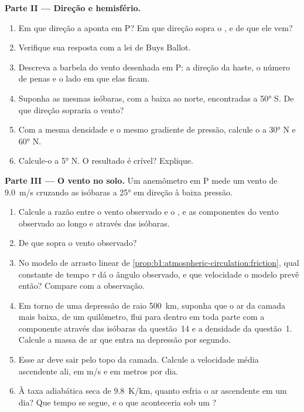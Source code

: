 \begin{problem}
\medskip
\noindent\textbf{Parte II --- Direção e hemisfério.}
\begin{enumerate}[resume]
  \item Em que direção a  aponta em P? Em que direção sopra o , e de que  ele vem?
  \item Verifique sua resposta com a lei de Buys Ballot.
  \item Descreva a barbela do vento desenhada em P: a direção da haste, o número de penas e o lado em
        que elas ficam.
  \item Suponha as mesmas isóbaras, com a baixa ao norte, encontradas a \ang{50} S. De que direção
        sopraria o vento?
  \item Com a mesma densidade e o mesmo gradiente de pressão, calcule o  a \ang{30} N
        e \ang{60} N.
  \item Calcule-o a \ang{5} N. O resultado é crível? Explique.
\end{enumerate}

\medskip
\noindent\textbf{Parte III --- O vento no solo.} Um anemômetro em P mede um vento de \qty{9.0}{m/s}
cruzando as isóbaras a \ang{25} em direção à baixa pressão.
\begin{enumerate}[resume]
  \item Calcule a razão entre o vento observado e o , e as componentes do vento
        observado ao longo e através das isóbaras.
  \item De que  sopra o vento observado?
  \item No modelo de arrasto linear de \cref{prop:b1:atmospheric-circulation:friction}, qual constante
        de tempo $\tau$ dá o ângulo observado, e que velocidade o modelo prevê então? Compare com a
        observação.
  \item Em torno de uma depressão de raio \qty{500}{km}, suponha que o ar da camada mais baixa, de um
        quilômetro, flui para dentro em toda parte com a componente através das isóbaras da questão~14 e
        a densidade da questão~1. Calcule a massa de ar que entra na depressão por segundo.
  \item Esse ar deve sair pelo topo da camada. Calcule a velocidade média ascendente ali, em
        \unit{m/s} e em metros por dia.
  \item À taxa adiabática seca de \qty{9.8}{K/km}, quanto esfria o ar ascendente em um dia? Que tempo
        se segue, e o que aconteceria sob um ?
\end{enumerate}


\end{problem}
